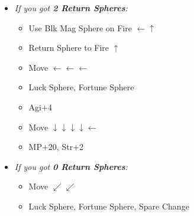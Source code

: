 \begin{spheregrid}
\begin{itemize}
\begin{itemize}
            \item \textit{If you got \textbf{2 Return Spheres}:}
            \begin{itemize}
                \item Use Blk Mag Sphere on Fire $\leftarrow\uparrow$
                \item Return Sphere to Fire $\uparrow$
                \item Move $\leftarrow\leftarrow\leftarrow$
                \item Luck Sphere, Fortune Sphere
                \item Agi+4
                \item Move $\downarrow\downarrow\downarrow\downarrow\leftarrow$
                \item MP+20, Str+2
            \end{itemize}
            \item \textit{If you got \textbf{0 Return Spheres}:}
            \begin{itemize}
                \item Move $\swarrow\swarrow$
                \item Luck Sphere, Fortune Sphere, Spare Change
            \end{itemize}

\end{itemize}
\end{itemize}
\end{spheregrid}
